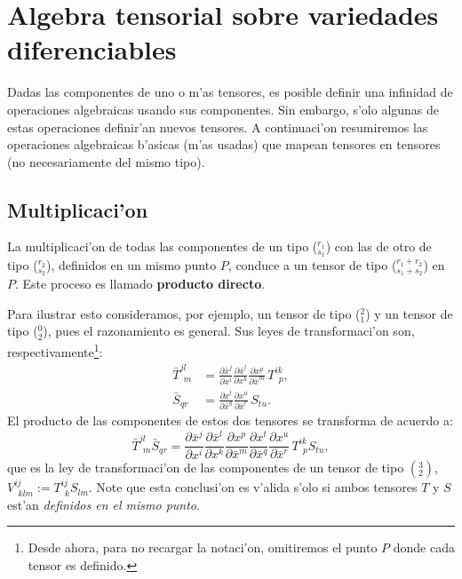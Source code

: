 \section{Algebra tensorial sobre variedades diferenciables}

Dadas las componentes de uno o m'as tensores, es posible definir una infinidad de operaciones algebraicas usando sus componentes. Sin embargo, s'olo algunas de estas operaciones definir'an nuevos tensores. A continuaci'on resumiremos las operaciones algebraicas b'asicas (m'as usadas) que mapean tensores en tensores (no necesariamente del mismo tipo).


\subsection{Multiplicaci'on}

La multiplicaci'on de todas las componentes de un tipo ($_{s_1}^{r_1}$) con las de otro de tipo ($_{s_2}^{r_2}$), definidos en un mismo punto $P$, conduce a un tensor de
tipo ($_{s_1+s_2}^{r_1+r_2}$) en $P$. Este proceso es llamado
\textbf{producto directo}.

Para ilustrar esto consideramos, por ejemplo, un tensor de tipo ($_1^2$) y
un tensor de tipo ($_2^0$), pues el razonamiento es general. Sus leyes de
transformaci'on son, respectivamente\footnote{Desde ahora, para no recargar la notaci'on, omitiremos el punto $P$ donde cada tensor es definido.}:
\begin{align}
\bar{T}_{\ \ m}^{jl} & =\frac{\partial\bar{x}^j }{\partial x^i }\frac
{\partial\bar{x}^l }{\partial x^k }\frac{\partial x^p}{\partial\bar{x}
^m }\,T_{\ \ p}^{ik},\label{mul1}\\
\bar{S}_{qr} & =\frac{\partial x^{t}}{\partial\bar{x}^q}\frac{\partial
x^{u}}{\partial\bar{x}^r}\,S_{tu}.\nonumber
\end{align}
El producto de las componentes de estos dos tensores se transforma de acuerdo a:
\begin{equation}
\bar{T}_{\ \ m}^{jl}\bar{S}_{qr}=\frac{\partial\bar{x}^j }{\partial x^i
}\frac{\partial\bar{x}^l}{\partial x^k}\frac{\partial
x^p}{\partial\bar{x}^m}
\frac{\partial x^t}{\partial\bar{x}^q}\frac{\partial
x^{u}}{\partial\bar{x}^r}\,T_{\ \ p}^{ik}S_{tu}, \label{2}
\end{equation}
que es la ley de transformaci'on de las componentes de un
tensor de tipo $(^3_2)$, $V_{\ \ klm}^{ij}:=T_{\ \ k}^{ij}S_{lm}$. Note que esta conclusi'on es v'alida s'olo si ambos tensores $T$ y $S$ est'an \textit{definidos en el mismo punto}.


